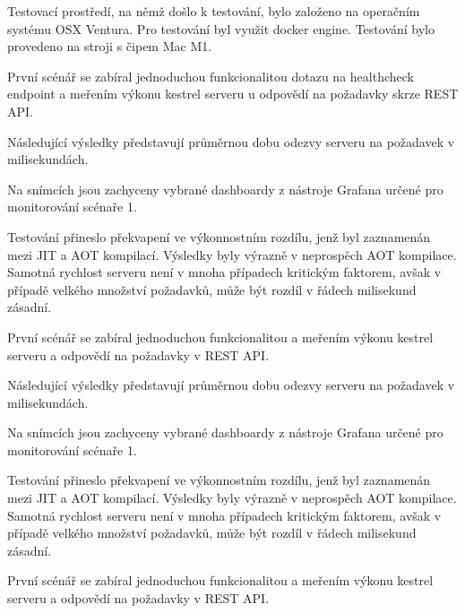 
Testovací prostředí, na němž došlo k testování, bylo založeno na operačním systému OSX Ventura. Pro testování byl využit docker engine. Testování bylo provedeno na stroji s čipem Mac M1.



První scénář se zabíral jednoduchou funkcionalitou dotazu na healthcheck endpoint a meřením výkonu kestrel serveru u odpovědí na požadavky skrze REST API.


Následující výsledky představují průměrnou dobu odezvy serveru na požadavek v milisekundách. 

Na snímcích jsou zachyceny vybrané dashboardy z nástroje Grafana určené pro monitorování scénaře 1. 


Testování přineslo překvapení ve výkonnostním rozdílu, jenž byl zaznamenán mezi JIT a AOT kompilací. Výsledky byly výrazně v neprospěch AOT kompilace. Samotná rychlost serveru není v mnoha případech kritickým faktorem, avšak v případě velkého množství požadavků, může být rozdíl v řádech milisekund zásadní.


První scénář se zabíral jednoduchou funkcionalitou a meřením výkonu kestrel serveru a odpovědí na požadavky v REST API.


Následující výsledky představují průměrnou dobu odezvy serveru na požadavek v milisekundách. 

Na snímcích jsou zachyceny vybrané dashboardy z nástroje Grafana určené pro monitorování scénaře 1. 


Testování přineslo překvapení ve výkonnostním rozdílu, jenž byl zaznamenán mezi JIT a AOT kompilací. Výsledky byly výrazně v neprospěch AOT kompilace. Samotná rychlost serveru není v mnoha případech kritickým faktorem, avšak v případě velkého množství požadavků, může být rozdíl v řádech milisekund zásadní.


První scénář se zabíral jednoduchou funkcionalitou a meřením výkonu kestrel serveru a odpovědí na požadavky v REST API.


